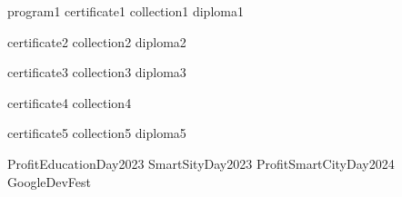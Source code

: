 \renewcommand\ExhibitGroup{Display}

{program1}
{certificate1}
{collection1}
{diploma1}

{certificate2}
{collection2}
{diploma2}


{certificate3}
{collection3}
{diploma3}

{certificate4}
{collection4}

{certificate5}
{collection5}
{diploma5}


{ProfitEducationDay2023}
{SmartSityDay2023}
{ProfitSmartCityDay2024}
{GoogleDevFest}

